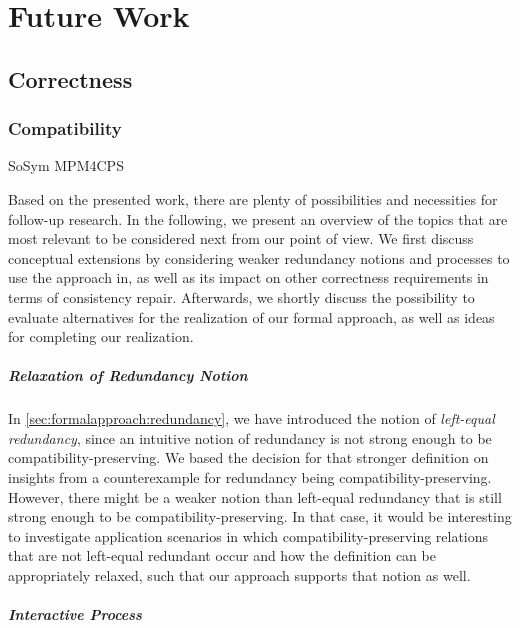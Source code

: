 \chapter{Future Work
}
\label{chap:futurework}

\section{Correctness}

\subsection{Compatibility}

\begin{copiedFrom}{SoSym MPM4CPS}

Based on the presented work, there are plenty of possibilities and necessities for follow-up research.
In the following, we present an overview of the topics that are most relevant to be considered next from our point of view.
We first discuss conceptual extensions by considering weaker redundancy notions and processes to use the approach in, as well as its impact on other correctness requirements in terms of consistency repair.
Afterwards, we shortly discuss the possibility to evaluate alternatives for the realization of our formal approach, as well as ideas for completing our realization.

\paragraph{Relaxation of Redundancy Notion}
In \autoref{sec:formalapproach:redundancy}, we have introduced the notion of \emph{left-equal redundancy}, since an intuitive notion of redundancy is not strong enough to be compatibility-preserving.
We based the decision for that stronger definition on insights from a counterexample for redundancy being compatibility-preserving.
However, there might be a weaker notion than left-equal redundancy that is still strong enough to be compatibility-preserving.
In that case, it would be interesting to investigate application scenarios in which compatibility-preserving relations that are not left-equal redundant occur and how the definition can be appropriately relaxed, such that our approach supports that notion as well.

\paragraph{Interactive Process}
\label{sec:futurework:compatibilityprocess}


\end{copiedFrom}

